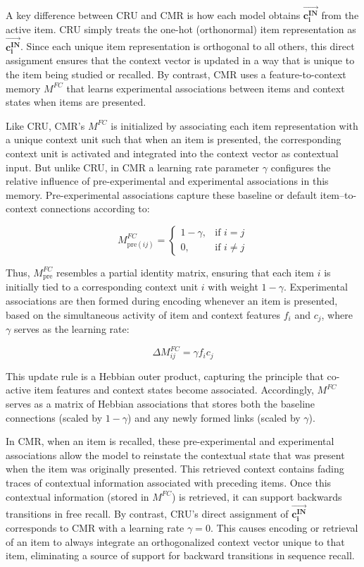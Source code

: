 \documentclass[
  man,
  floatsintext,
  longtable,
  nolmodern,
  notxfonts,
  notimes,
  draftfirst,
  colorlinks=true,linkcolor=blue,citecolor=blue,urlcolor=blue]{apa7}
\begin{document}
A key difference between CRU and CMR is how each model obtains
\(\mathbf{\vec{c_i^{IN}}}\) from the active item. CRU simply treats the
one-hot (orthonormal) item representation as
\(\mathbf{\vec{c_i^{IN}}}\). Since each unique item representation is
orthogonal to all others, this direct assignment ensures that the
context vector is updated in a way that is unique to the item being
studied or recalled. By contrast, CMR uses a feature-to-context memory
\(M^{FC}\) that learns experimental associations between items and
context states when items are presented.

Like CRU, CMR's \(M^{FC}\) is initialized by associating each item
representation with a unique context unit such that when an item is
presented, the corresponding context unit is activated and integrated
into the context vector as contextual input. But unlike CRU, in CMR a
learning rate parameter \(\gamma\) configures the relative influence of
pre-experimental and experimental associations in this memory.
Pre-experimental associations capture these baseline or default
item--to-context connections according to:

\[
M^{FC}_{\text{pre}(ij)} = \begin{cases} 
1 - \gamma, & \text{if } i=j \\ 
0, & \text{if } i \neq j 
\end{cases}
\]

Thus, \(M^{FC}_\text{pre}\) resembles a partial identity matrix,
ensuring that each item \(i\) is initially tied to a corresponding
context unit \(i\) with weight \(1 - \gamma\). Experimental associations
are then formed during encoding whenever an item is presented, based on
the simultaneous activity of item and context features \(f_i\) and
\(c_j\), where \(\gamma\) serves as the learning rate:

\[
\Delta M^{FC}_{ij} = \gamma f_i c_j
\]

This update rule is a Hebbian outer product, capturing the principle
that co-active item features and context states become associated.
Accordingly, \(M^{FC}\) serves as a matrix of Hebbian associations that
stores both the baseline connections (scaled by \(1 - \gamma\)) and any
newly formed links (scaled by \(\gamma\)).

In CMR, when an item is recalled, these pre-experimental and
experimental associations allow the model to reinstate the contextual
state that was present when the item was originally presented. This
retrieved context contains fading traces of contextual information
associated with preceding items. Once this contextual information
(stored in \(M^{FC}\)) is retrieved, it can support backwards
transitions in free recall. By contrast, CRU's direct assignment of
\(\mathbf{\vec{c_i^{IN}}}\) corresponds to CMR with a learning rate
\(\gamma=0\). This causes encoding or retrieval of an item to always
integrate an orthogonalized context vector unique to that item,
eliminating a source of support for backward transitions in sequence
recall.
\end{document}
